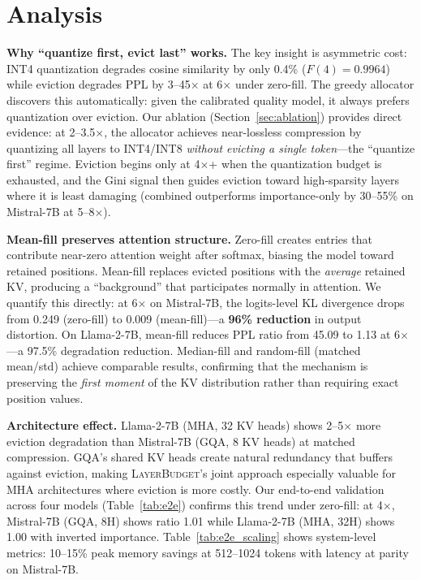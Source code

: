 \documentclass{article}
\newcommand{\layerbudget}{\textsc{LayerBudget}\xspace}
\begin{document}
\section{Analysis}
\label{sec:analysis}

\textbf{Why ``quantize first, evict last'' works.}
The key insight is asymmetric cost: INT4 quantization degrades cosine similarity by only 0.4\% ($F(4) = 0.9964$) while eviction degrades PPL by 3--45$\times$ at 6$\times$ under zero-fill.
The greedy allocator discovers this automatically: given the calibrated quality model, it always prefers quantization over eviction.
Our ablation (Section~\ref{sec:ablation}) provides direct evidence: at 2--3.5$\times$, the allocator achieves near-lossless compression by quantizing all layers to INT4/INT8 \emph{without evicting a single token}---the ``quantize first'' regime.
Eviction begins only at 4$\times$+ when the quantization budget is exhausted, and the Gini signal then guides eviction toward high-sparsity layers where it is least damaging (combined outperforms importance-only by 30--55\% on Mistral-7B at 5--8$\times$).

\textbf{Mean-fill preserves attention structure.}
Zero-fill creates entries that contribute near-zero attention weight after softmax, biasing the model toward retained positions.
Mean-fill replaces evicted positions with the \emph{average} retained KV, producing a ``background'' that participates normally in attention.
We quantify this directly: at 6$\times$ on Mistral-7B, the logits-level KL divergence drops from 0.249 (zero-fill) to 0.009 (mean-fill)---a \textbf{96\% reduction} in output distortion.
On Llama-2-7B, mean-fill reduces PPL ratio from 45.09 to 1.13 at 6$\times$---a 97.5\% degradation reduction.
Median-fill and random-fill (matched mean/std) achieve comparable results, confirming that the mechanism is preserving the \emph{first moment} of the KV distribution rather than requiring exact position values.

\textbf{Architecture effect.}
Llama-2-7B (MHA, 32 KV heads) shows 2--5$\times$ more eviction degradation than Mistral-7B (GQA, 8 KV heads) at matched compression.
GQA's shared KV heads create natural redundancy that buffers against eviction, making \layerbudget's joint approach especially valuable for MHA architectures where eviction is more costly.
Our end-to-end validation across four models (Table~\ref{tab:e2e}) confirms this trend under zero-fill: at 4$\times$, Mistral-7B (GQA, 8H) shows ratio 1.01 while Llama-2-7B (MHA, 32H) shows 1.00 with inverted importance.
Table~\ref{tab:e2e_scaling} shows system-level metrics: 10--15\% peak memory savings at 512--1024 tokens with latency at parity on Mistral-7B.
\end{document}

